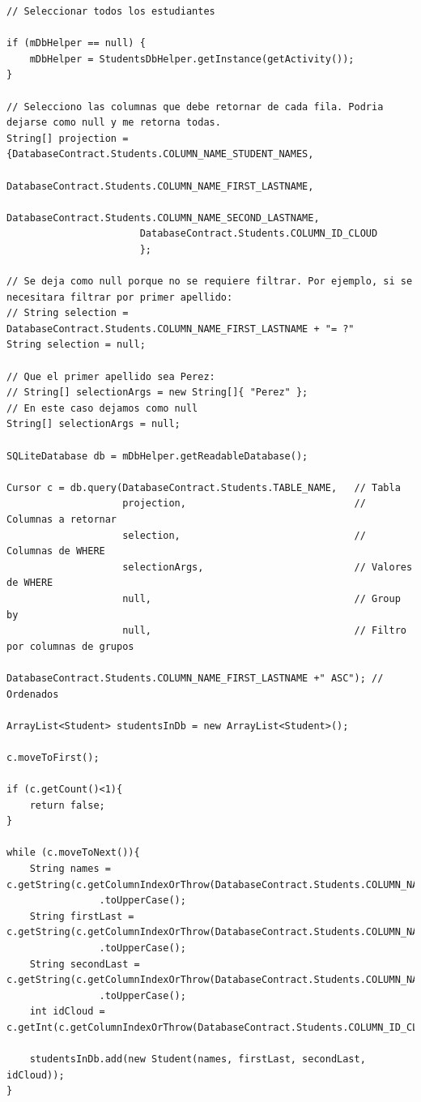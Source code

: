 \documentclass[10pt]{extarticle}
\begin{document}
\begin{lstlisting}
// Seleccionar todos los estudiantes

if (mDbHelper == null) {
    mDbHelper = StudentsDbHelper.getInstance(getActivity());
}

// Selecciono las columnas que debe retornar de cada fila. Podria dejarse como null y me retorna todas.
String[] projection = {DatabaseContract.Students.COLUMN_NAME_STUDENT_NAMES,
                       DatabaseContract.Students.COLUMN_NAME_FIRST_LASTNAME,
                       DatabaseContract.Students.COLUMN_NAME_SECOND_LASTNAME,
                       DatabaseContract.Students.COLUMN_ID_CLOUD
                       };

// Se deja como null porque no se requiere filtrar. Por ejemplo, si se necesitara filtrar por primer apellido:
// String selection = DatabaseContract.Students.COLUMN_NAME_FIRST_LASTNAME + "= ?"
String selection = null;

// Que el primer apellido sea Perez:
// String[] selectionArgs = new String[]{ "Perez" };
// En este caso dejamos como null
String[] selectionArgs = null;

SQLiteDatabase db = mDbHelper.getReadableDatabase();

Cursor c = db.query(DatabaseContract.Students.TABLE_NAME,   // Tabla
                    projection,                             // Columnas a retornar
                    selection,                              // Columnas de WHERE
                    selectionArgs,                          // Valores de WHERE
                    null,                                   // Group by
                    null,                                   // Filtro por columnas de grupos
                    DatabaseContract.Students.COLUMN_NAME_FIRST_LASTNAME +" ASC"); // Ordenados

ArrayList<Student> studentsInDb = new ArrayList<Student>();

c.moveToFirst();

if (c.getCount()<1){
    return false;
}

while (c.moveToNext()){
    String names = c.getString(c.getColumnIndexOrThrow(DatabaseContract.Students.COLUMN_NAME_STUDENT_NAMES))
    		    .toUpperCase();
    String firstLast = c.getString(c.getColumnIndexOrThrow(DatabaseContract.Students.COLUMN_NAME_FIRST_LASTNAME))
    		    .toUpperCase();
    String secondLast = c.getString(c.getColumnIndexOrThrow(DatabaseContract.Students.COLUMN_NAME_SECOND_LASTNAME))
    			.toUpperCase();
    int idCloud = c.getInt(c.getColumnIndexOrThrow(DatabaseContract.Students.COLUMN_ID_CLOUD));
    
    studentsInDb.add(new Student(names, firstLast, secondLast, idCloud));
}
     
\end{lstlisting}
\end{document}

